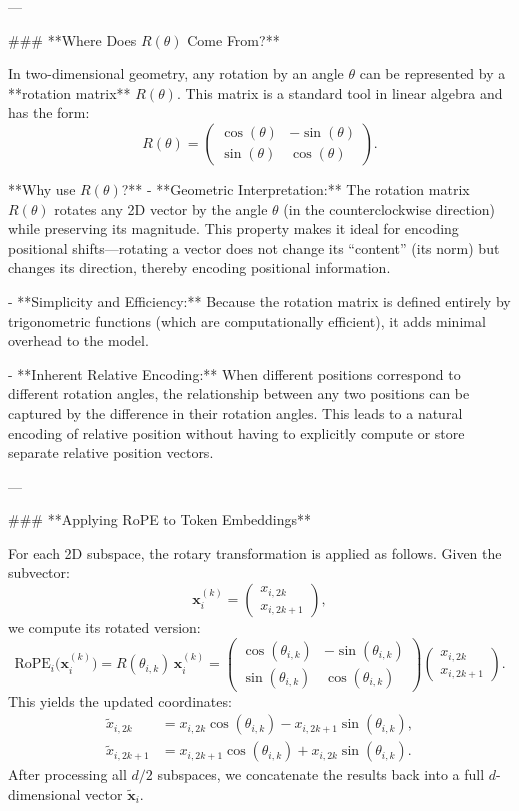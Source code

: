 ---

### **Where Does \(R(\theta)\) Come From?**

In two-dimensional geometry, any rotation by an angle \(\theta\) can be represented by a **rotation matrix** \(R(\theta)\). This matrix is a standard tool in linear algebra and has the form:
\[
R(\theta) = 
\begin{pmatrix}
\cos(\theta) & -\sin(\theta) \\
\sin(\theta) & \cos(\theta)
\end{pmatrix}.
\]

**Why use \(R(\theta)\)?**  
- **Geometric Interpretation:**  
  The rotation matrix \(R(\theta)\) rotates any 2D vector by the angle \(\theta\) (in the counterclockwise direction) while preserving its magnitude. This property makes it ideal for encoding positional shifts—rotating a vector does not change its “content” (its norm) but changes its direction, thereby encoding positional information.
  
- **Simplicity and Efficiency:**  
  Because the rotation matrix is defined entirely by trigonometric functions (which are computationally efficient), it adds minimal overhead to the model.

- **Inherent Relative Encoding:**  
  When different positions correspond to different rotation angles, the relationship between any two positions can be captured by the difference in their rotation angles. This leads to a natural encoding of relative position without having to explicitly compute or store separate relative position vectors.

---

### **Applying RoPE to Token Embeddings**

For each 2D subspace, the rotary transformation is applied as follows. Given the subvector:
\[
\mathbf{x}_i^{(k)} = 
\begin{pmatrix}
x_{i,2k} \\
x_{i,2k+1}
\end{pmatrix},
\]
we compute its rotated version:
\[
\text{RoPE}_i \bigl(\mathbf{x}_i^{(k)}\bigr)
= R(\theta_{i, k})\, \mathbf{x}_i^{(k)}
= \begin{pmatrix}
\cos(\theta_{i, k}) & -\sin(\theta_{i, k}) \\
\sin(\theta_{i, k}) & \cos(\theta_{i, k})
\end{pmatrix}
\begin{pmatrix}
x_{i,2k} \\
x_{i,2k+1}
\end{pmatrix}.
\]
This yields the updated coordinates:
\[
\begin{aligned}
\tilde{x}_{i, 2k} &= x_{i,2k}\cos(\theta_{i,k}) - x_{i,2k+1}\sin(\theta_{i,k}),\\[6pt]
\tilde{x}_{i, 2k+1} &= x_{i,2k+1}\cos(\theta_{i,k}) + x_{i,2k}\sin(\theta_{i,k}).
\end{aligned}
\]
After processing all \(d/2\) subspaces, we concatenate the results back into a full \(d\)-dimensional vector \(\tilde{\mathbf{x}}_i\).

